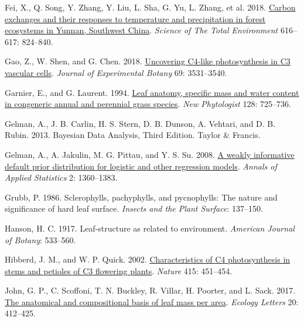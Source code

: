 \documentclass[
  12pt,
  a4paper,
,tablecaptionabove
]{scrartcl}
\newlength{\cslhangindent}
\newenvironment{CSLReferences}[2] %
 {%
  \setlength{\parindent}{0pt}
  \ifodd #1 \everypar{\setlength{\hangindent}{\cslhangindent}}\ignorespaces\fi
  \ifnum #2 > 0
  \setlength{\parskip}{#2\baselineskip}
  \fi
 }%
 {}
\begin{document}
\begin{CSLReferences}{1}{0}
\leavevmode{}%
Fei, X., Q. Song, Y. Zhang, Y. Liu, L. Sha, G. Yu, L. Zhang, et al. 2018. \href{https://doi.org/10.1016/j.scitotenv.2017.10.239}{Carbon exchanges and their responses to temperature and precipitation in forest ecosystems in {Yunnan}, {Southwest China}}. \emph{Science of The Total Environment} 616--617: 824--840.

\leavevmode{}%
Gao, Z., W. Shen, and G. Chen. 2018. \href{https://doi.org/10.1093/jxb/ery155}{Uncovering {C4-like} photosynthesis in {C3} vascular cells}. \emph{Journal of Experimental Botany} 69: 3531--3540.

\leavevmode{}%
Garnier, E., and G. Laurent. 1994. \href{https://doi.org/10.1111/j.1469-8137.1994.tb04036.x}{Leaf anatomy, specific mass and water content in congeneric annual and perennial grass species}. \emph{New Phytologist} 128: 725--736.

\leavevmode{}%
Gelman, A., J. B. Carlin, H. S. Stern, D. B. Dunson, A. Vehtari, and D. B. Rubin. 2013. Bayesian {Data Analysis}, {Third Edition}. {Taylor \& Francis}.

\leavevmode{}%
Gelman, A., A. Jakulin, M. G. Pittau, and Y. S. Su. 2008. \href{https://doi.org/10.1214/08-AOAS191}{A weakly informative default prior distribution for logistic and other regression models}. \emph{Annals of Applied Statistics} 2: 1360--1383.

\leavevmode{}%
Grubb, P. 1986. Sclerophylls, pachyphylls, and pycnophylls: {The} nature and significance of hard leaf surface. \emph{Insects and the Plant Surface}: 137--150.

\leavevmode{}%
Hanson, H. C. 1917. Leaf-structure as related to environment. \emph{American Journal of Botany}: 533--560.

\leavevmode{}%
Hibberd, J. M., and W. P. Quick. 2002. \href{https://doi.org/10.1038/415451a}{Characteristics of {C4} photosynthesis in stems and petioles of {C3} flowering plants}. \emph{Nature} 415: 451--454.

\leavevmode{}%
John, G. P., C. Scoffoni, T. N. Buckley, R. Villar, H. Poorter, and L. Sack. 2017. \href{https://doi.org/10.1111/ele.12739}{The anatomical and compositional basis of leaf mass per area}. \emph{Ecology Letters} 20: 412--425.


\end{CSLReferences}
\end{document}
